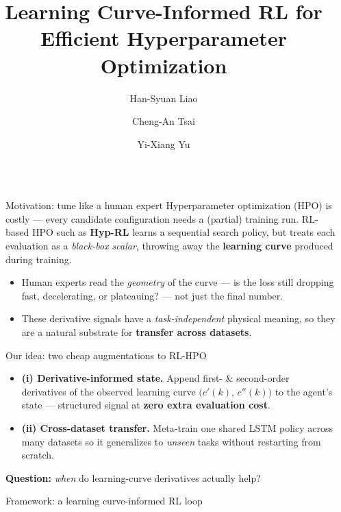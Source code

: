 \documentclass[final,20pt]{beamer}
\title{Learning Curve-Informed RL for Efficient Hyperparameter Optimization}
\author{Han-Syuan Liao\inst{1} \and Cheng-An Tsai\inst{1} \and Yi-Xiang Yu\inst{1}}
\institute[shortinst]{\inst{1} Department of Computer Science, National Yang Ming Chiao Tung University}
\newlength{\sepwidth}
\newlength{\colwidth}
\newcommand{\separatorcolumn}{\begin{column}{\sepwidth}\end{column}}
\begin{document}
\begin{frame}[t]
\begin{columns}[t]
\separatorcolumn

\begin{column}{\colwidth}

  \begin{block}{Motivation: tune like a human expert}
    Hyperparameter optimization (HPO) is costly --- every candidate configuration
    needs a (partial) training run. RL-based HPO such as \textbf{Hyp-RL}
    learns a sequential search policy, but treats each evaluation as a
    \emph{black-box scalar}, throwing away the \textbf{learning curve} produced during training.

    \begin{itemize}
      \item Human experts read the \emph{geometry} of the curve --- is the loss still
            dropping fast, decelerating, or plateauing? --- not just the final number.
      \item These derivative signals have a \emph{task-independent} physical meaning,
            so they are a natural substrate for \textbf{transfer across datasets}.
    \end{itemize}
  \end{block}

  \begin{alertblock}{Our idea: two cheap augmentations to RL-HPO}
    \begin{itemize}
      \item \textbf{(i) Derivative-informed state.} Append first- \& second-order
            derivatives of the observed learning curve $\big(c'(k),\,c''(k)\big)$
            to the agent's state --- structured signal at \textbf{zero extra evaluation cost}.
      \item \textbf{(ii) Cross-dataset transfer.} Meta-train one shared LSTM policy
            across many datasets so it generalizes to \emph{unseen} tasks without
            restarting from scratch.
    \end{itemize}
    \textbf{Question:} \emph{when} do learning-curve derivatives actually help?
  \end{alertblock}

 \begin{block}{Framework: a learning curve-informed RL loop}


\end{block}
\end{column}
\end{columns}
\end{frame}
\end{document}
